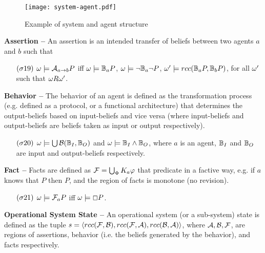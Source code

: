 \begin{figure}[t]
	\centering
	\texttt{[image: system-agent.pdf]}
	\caption{Example of system and agent structure}
	\label{fig:system-agent}
\end{figure}

\begin{definition}{\bf Assertion -- }\label{def:assertion}
	An assertion is an intended transfer of beliefs between
	two agents $a$ and $b$ such that
	\begin{enumerate}[noitemsep]
		\item[$(\sigma19)$] $\omega\models\mathcal{A}_{a\rightarrow b}P$ iff
			$\omega\models\mathbb{B}_{a}{P}$, 
			$\omega\models\neg\mathbb{B}_{a}{\neg P}$, 
			$\omega'\models rcc(\mathbb{B}_{a}{P},\mathbb{B}_{b}{P})$, 
			for all $\omega'$ such that $\omega R\omega'$.
	\end{enumerate}
\end{definition}

\begin{definition}{\bf Behavior -- }\label{def:behavior}
	The behavior of an agent is defined as the transformation process (e.g. defined as a
	protocol, or a functional architecture) that determines the
	output-beliefs based on input-beliefs and vice versa (where input-beliefs and
	output-beliefs are beliefs taken as input or output respectively).
	\begin{enumerate}[noitemsep]
		\item[$(\sigma20)$] $\omega\models\bigcup\mathcal{B}(\mathbb{B}_I,\mathbb{B}_O)$ and 
			$\omega\models\mathbb{B}_I\wedge\mathbb{B}_O$,
		where $a$ is an agent, $\mathbb{B}_I$ and $\mathbb{B}_O$ are input and output-beliefs respectively.
	\end{enumerate}
\end{definition}

\begin{definition}{\bf Fact -- }\label{def:fact}
	Facts are defined as $\mathcal{F} = \bigcup_\Phi K_{a}\varphi$
	that predicate in a factive way, e.g.
	if $a$ knows that $P$ then $P$, and the region of facts is monotone (no revision).
	\begin{enumerate}[noitemsep]
		\item[$(\sigma21)$] $\omega\models\mathcal{F}_{a}P$ iff
			$\omega \models \Box P$. 
	\end{enumerate}
\end{definition}

\begin{definition}{\bf Operational System State --}\label{def:opsystem}
	An operational system (or a sub-system) state is defined as the tuple
	$s=\langle rcc(\mathcal{F},\mathcal{B}),rcc(\mathcal{F},\mathcal{A}),rcc(\mathcal{B},\mathcal{A})\rangle$,
	where $\mathcal{A},\mathcal{B},\mathcal{F}$, are regions of assertions, behavior (i.e. the beliefs generated by the behavior), and facts respectively.
\end{definition}


